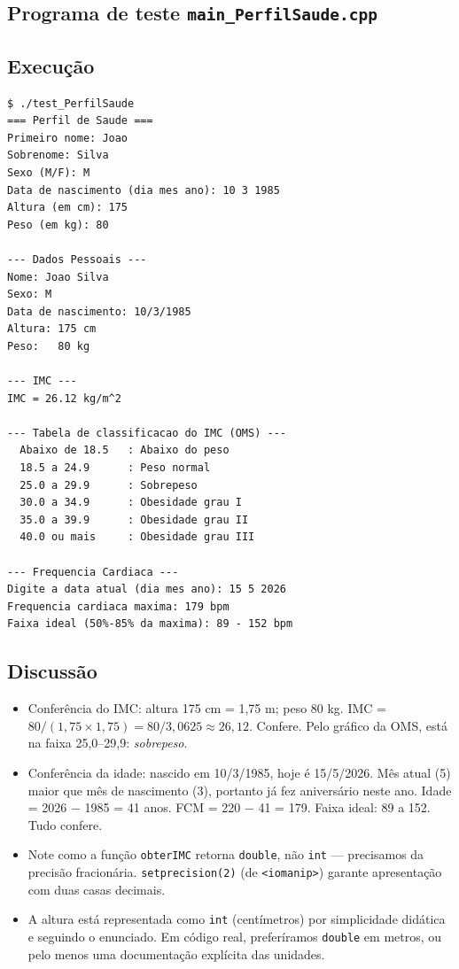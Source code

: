 \documentclass[11pt,a4paper]{article}
\begin{document}


\subsection*{Programa de teste \texttt{main\_PerfilSaude.cpp}}



\subsection*{Execu\c{c}\~ao}

\begin{saidabox}
\begin{lstlisting}[style=terminal]
$ ./test_PerfilSaude
=== Perfil de Saude ===
Primeiro nome: Joao
Sobrenome: Silva
Sexo (M/F): M
Data de nascimento (dia mes ano): 10 3 1985
Altura (em cm): 175
Peso (em kg): 80

--- Dados Pessoais ---
Nome: Joao Silva
Sexo: M
Data de nascimento: 10/3/1985
Altura: 175 cm
Peso:   80 kg

--- IMC ---
IMC = 26.12 kg/m^2

--- Tabela de classificacao do IMC (OMS) ---
  Abaixo de 18.5   : Abaixo do peso
  18.5 a 24.9      : Peso normal
  25.0 a 29.9      : Sobrepeso
  30.0 a 34.9      : Obesidade grau I
  35.0 a 39.9      : Obesidade grau II
  40.0 ou mais     : Obesidade grau III

--- Frequencia Cardiaca ---
Digite a data atual (dia mes ano): 15 5 2026
Frequencia cardiaca maxima: 179 bpm
Faixa ideal (50%-85% da maxima): 89 - 152 bpm
\end{lstlisting}
\end{saidabox}

\subsection*{Discuss\~ao}

\begin{itemize}[leftmargin=*]
  \item Confer\^encia do IMC: altura 175 cm = 1,75 m; peso 80 kg. IMC = $80 / (1{,}75 \times 1{,}75) = 80 / 3{,}0625 \approx 26{,}12$. Confere. Pelo gr\'afico da OMS, est\'a na faixa 25,0--29,9: \emph{sobrepeso}.
  \item Confer\^encia da idade: nascido em 10/3/1985, hoje \'e 15/5/2026. M\^es atual (5) maior que m\^es de nascimento (3), portanto j\'a fez anivers\'ario neste ano. Idade = 2026 $-$ 1985 = 41 anos. FCM = 220 $-$ 41 = 179. Faixa ideal: 89 a 152. Tudo confere.
  \item Note como a fun\c{c}\~ao \texttt{obterIMC} retorna \texttt{double}, n\~ao \texttt{int} --- precisamos da precis\~ao fracion\'aria. \texttt{setprecision(2)} (de \texttt{<iomanip>}) garante apresenta\c{c}\~ao com duas casas decimais.
  \item A altura est\'a representada como \texttt{int} (cent\'imetros) por simplicidade did\'atica e seguindo o enunciado. Em c\'odigo real, prefer\'iramos \texttt{double} em metros, ou pelo menos uma documenta\c{c}\~ao expl\'icita das unidades.
\end{itemize}
\end{document}
